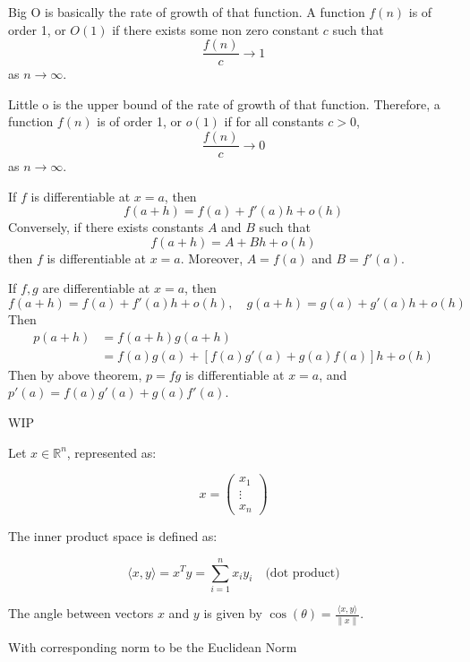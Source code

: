\begin{definition}
    Big O is basically the rate of growth of that function. A function $f(n)$ is of order 1, or $O(1)$ if there exists some non zero constant $c$ such that $$\frac{f(n)}{c} \rightarrow 1$$ as $n \rightarrow \infty$.

    Little o is the upper bound of the rate of growth of that function. Therefore, a function $f(n)$ is of order 1, or $o(1)$ if for all constants $c > 0$, $$\frac{f(n)}{c} \rightarrow 0$$ as $n \rightarrow \infty$.
\end{definition}

\begin{definition}
    If $f$ is differentiable at $x = a$, then $$f(a + h) = f(a) + f'(a)h + o(h)$$
    Conversely, if there exists constants $A$ and $B$ such that $$f(a + h) = A + Bh + o(h)$$ then $f$ is differentiable at $x = a$. Moreover, $A = f(a)$ and $B = f'(a)$.
\end{definition}
\begin{definition}
    If $f, g$ are differentiable at $x = a$, then $$f(a + h) = f(a) + f'(a)h + o(h), \quad g(a + h) = g(a) + g'(a)h + o(h)$$
    Then
    \begin{align*}
        p(a + h) &= f(a + h)g(a + h) \\
        &= f(a)g(a) + [f(a)g'(a) + g(a)f(a)]h + o(h) 
    \end{align*}
    Then by above theorem, $p = fg$ is differentiable at $x = a$, and $p'(a) = f(a)g'(a) + g(a)f'(a)$.
\end{definition}
\begin{definition}
    WIP
\end{definition}



\begin{definition}
    Let $x \in \mathbb{R}^n$, represented as:
    
    \[
    x = \begin{pmatrix}
        x_1 \\
        \vdots \\
        x_n
    \end{pmatrix}
    \]
    
    The inner product space is defined as:
    
    \[
    \langle x, y \rangle = x^T y = \sum_{i=1}^{n} x_i y_i \quad \text{(dot product)}
    \]

    The angle between vectors $x$ and $y$ is given by $\cos(\theta) = \frac{\langle x, y \rangle}{\|x\|}$.

    With corresponding norm to be the Euclidean Norm
\end{definition}

